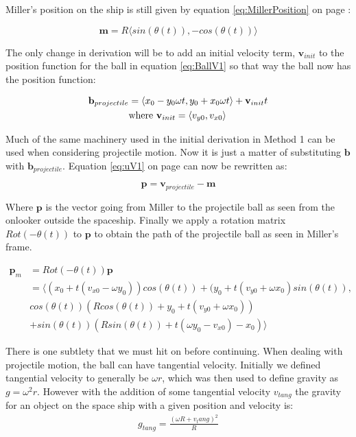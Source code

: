\documentclass{amsart}
\renewcommand{\vec}{\textbf}
\theoremstyle{definition}
\begin{document}
Miller's position on the ship is still given by equation
\ref{eq:MillerPosition} on page \pageref{eq:MillerPosition}:

\[\vec{m} = R\langle sin(\theta (t) ), - cos (\theta (t) ) \rangle\]

The only change in derivation will be to add an initial velocity term,
$\vec{v}_{init}$ to the position function for the ball in equation
\ref{eq:BallV1} so that way the ball now has the position function:

\begin{equation}\label{eq:BallProjectile}
\begin{split}
     \vec{b}_{projectile} &= \langle x_0 - y_0 \omega t, y_0 + x_0 \omega t \rangle + \vec{v}_{init}t \\ 
     &\textnormal{where } \vec{v}_{init} = \langle v_{y0},v_{x0} \rangle
\end{split}
\end{equation}

Much of the same machinery used in the initial derivation in Method 1
can be used when considering projectile motion. Now it is just a
matter of substituting $\vec{b}$ with $\vec{b}_{projectile}$. Equation
\ref{eq:uV1} on page \pageref{eq:uV1} can now be rewritten as:

\begin{equation}
    \vec{p} = \vec{v}_{projectile} - \vec{m}
\end{equation}

Where $\vec{p}$ is the vector going from Miller to the projectile ball
as seen from the onlooker outside the spaceship. Finally we apply a
rotation matrix $Rot(-\theta(t))$ to $\vec{p}$ to obtain the path of
the projectile ball as seen in Miller's frame.

\begin{equation}\label{eq:ProjectileMillerFrame}
\begin{split}
    \vec{p}_m &= Rot(-\theta(t))\vec{p} \\
    &= \langle (x_0 + t(v_{x0} - \omega y_0)) cos(\theta(t)) + (y_0 +t(v_{y0} + \omega x_0) sin(\theta(t)),\\
    & cos(\theta(t)) (R cos(\theta(t)) + y_0 + t(v_{y0} + \omega x_0)) \\
    &+ sin(\theta(t))(R sin(\theta(t)) + t(\omega y_0 - v_{x0})-x_0) \rangle
\end{split}
\end{equation}

There is one subtlety that we must hit on before continuing. When
dealing with projectile motion, the ball can have tangential
velocity. Initially we defined tangential velocity to generally be
$\omega r$, which was then used to define gravity as $g = \omega^2 r$.
However with the addition of some tangential velocity $v_{tang}$ the
gravity for an object on the space ship with a given position and
velocity is:
\begin{equation}\label{eq:TangentGravity}
\begin{split}
    g_{tang} = \frac{(\omega R + v_tang)^2}{R}
\end{split}
\end{equation}
\end{document}
